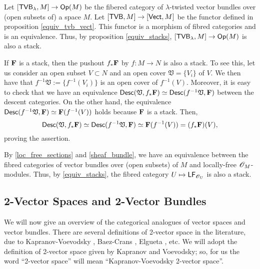 \begin{ej}\label{st_ex3}
Let $[\mathsf{TVB}_{\lambda},M]\to \mathsf{Op}(M)$ be the fibered category of $\lambda$-twisted vector bundles over (open subsets of) a space $M$. Let $[\mathsf{TVB},M]\to [\mathsf{Vect},M]$ be the functor defined in proposition \ref{equiv_tvb_vect}. This functor is a morphism of fibred categories and is an equivalence. Thus, by proposition \ref{equiv_stacks}, $[\mathsf{TVB}_{\lambda},M]\to \mathsf{Op}(M)$ is also a stack.
\end{ej}

\begin{ej}\label{st_ex4}
If ${\bf F}$ is a stack, then the pushout $f_*{\bf F}$ by $f:M\to N$ is also a stack. To see this, let us consider an open subset $V\subset N$ and an open cover $\mathfrak{V}=\{V_i\}$ of $V$. We then have that $f^{-1}\mathfrak{V}:=\{f^{-1}(V_i)\}$ is an open cover of $f^{-1}(V)$. Moreover, it is easy to check that we have an equivalence $\mathsf{Desc}(\mathfrak{V},f_*{\bf F})\simeq \mathsf{Desc}(f^{-1}\mathfrak{V},{\bf F})$ between the descent categories. On the other hand, the equivalence $\mathsf{Desc}(f^{-1}\mathfrak{V},{\bf F})\simeq {\bf F}(f^{-1}(V))$ holds because ${\bf F}$ is a stack. Then,
$$\mathsf{Desc}(\mathfrak{V},f_*{\bf F})\simeq \mathsf{Desc}(f^{-1}\mathfrak{V},{\bf F})\simeq {\bf F}(f^{-1}(V))= (f_*{\bf F})(V),$$
proving the assertion.
\end{ej}

\begin{ej}\label{st_ex4}
By \ref{loc_free_sections} and \ref{sheaf_bundle}, we have an equivalence between the fibred categories of vector bundles over (open subsets) of $M$ and locally-free $\mathscr{O}_M$-modules. Thus, by \ref{equiv_stacks}, the fibred category $U\mapsto \mathsf{LF}_{\mathscr{O}_U}$ is also a stack.
\end{ej}


\subsection{2-Vector Spaces and 2-Vector Bundles}
\label{sec:algebra}


We will now give an overview of the categorical analogues of vector spaces and vector bundles. There are several definitions of 2-vector space in the literature, due to Kapranov-Voevodsky \cite{kn:kv}, Baez-Crans \cite{baezcrans:2vector}, Elgueta \cite{elgueta:2vector}, etc. We will adopt the definition of 2-vector space given by Kapranov and Voevodsky; so, for us the word ``2-vector space'' will mean ``Kapranov-Voevodsky 2-vector space''.

